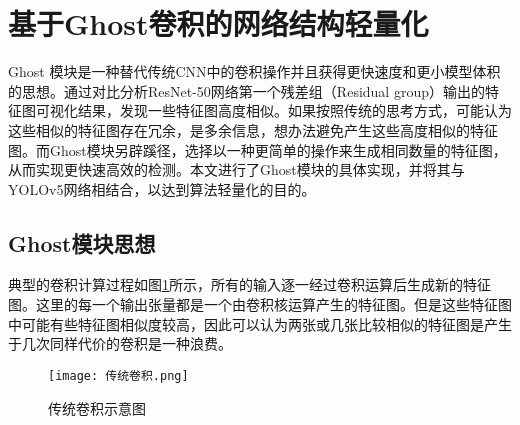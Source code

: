 




\section{基于Ghost卷积的网络结构轻量化}
Ghost 模块是一种替代传统CNN中的卷积操作并且获得更快速度和更小模型体积的思想\cite{han2020ghostnet}。通过对比分析ResNet-50网络第一个残差组（Residual group）输出的特征图可视化结果，发现一些特征图高度相似。如果按照传统的思考方式，可能认为这些相似的特征图存在冗余，是多余信息，想办法避免产生这些高度相似的特征图。而Ghost模块另辟蹊径，选择以一种更简单的操作来生成相同数量的特征图，从而实现更快速高效的检测。本文进行了Ghost模块的具体实现，并将其与YOLOv5网络相结合，以达到算法轻量化的目的。

\subsection{Ghost模块思想}
典型的卷积计算过程如图\ref{conv}所示，所有的输入逐一经过卷积运算后生成新的特征图。这里的每一个输出张量都是一个由卷积核运算产生的特征图。但是这些特征图中可能有些特征图相似度较高，因此可以认为两张或几张比较相似的特征图是产生于几次同样代价的卷积是一种浪费。

\begin{figure}[htbp]
    \centering
    \texttt{[image: 传统卷积.png]}
    \caption{传统卷积示意图}
    \label{conv}
\end{figure}

